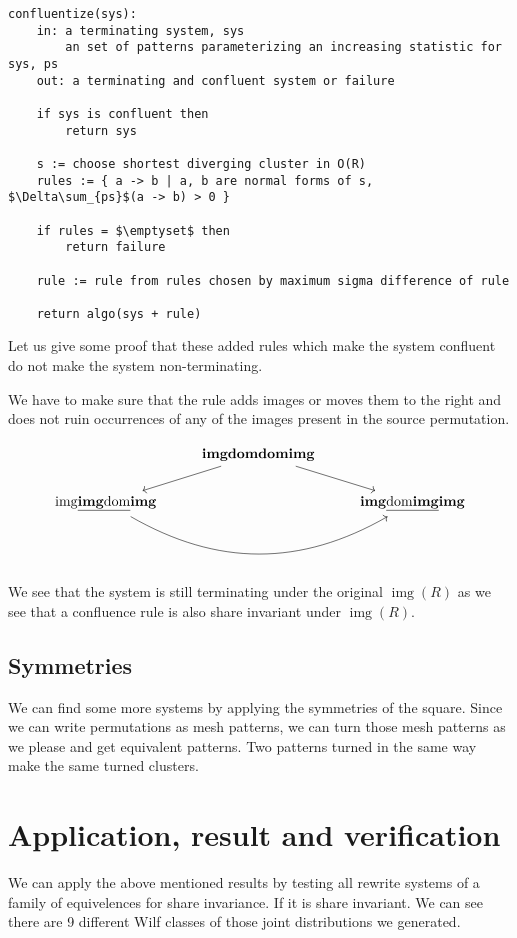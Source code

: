 \documentclass[openany, a4paper, 11pt, english]{article}
\theoremstyle{definition}
\DeclareMathOperator{\img}{img}
\begin{document}
\lstset{basicstyle=\footnotesize\ttfamily, frame=single, breaklines=true,
mathescape=true}
\begin{minipage}{\linewidth}
\begin{lstlisting}[title={Confluentize}]
confluentize(sys):
    in: a terminating system, sys
        an set of patterns parameterizing an increasing statistic for sys, ps
    out: a terminating and confluent system or failure

    if sys is confluent then
        return sys

    s := choose shortest diverging cluster in O(R)
    rules := { a -> b | a, b are normal forms of s, $\Delta\sum_{ps}$(a -> b) > 0 }

    if rules = $\emptyset$ then
        return failure

    rule := rule from rules chosen by maximum sigma difference of rule

    return algo(sys + rule)
\end{lstlisting}
\end{minipage}

Let us give some proof that these added rules which make the system confluent do
not make the system non-terminating.
 
We have to make sure that the rule adds images or moves them to the right and does not ruin
occurrences of any of the images present in the source permutation.

\[
\begin{tikzcd}  
    & \mathbf{imgdomdomimg} \arrow[dl] \arrow[dr] & \\
    \mathrm{img}\underline{\mathbf{img}\mathrm{dom}}\mathbf{img} \arrow[bend
    right=30]{rr} & & \mathbf{img}\underline{\mathrm{dom}\mathbf{img}}\mathbf{img}
\end{tikzcd}
\]

We see that the system is still terminating under the original $\img(R)$ as we see
that a confluence rule is also share invariant under $\img(R)$.

\subsection{Symmetries}
We can find some more systems by applying the symmetries of the square. Since we
can write permutations as mesh patterns, we can turn those mesh patterns as we
please and get equivalent patterns. Two patterns turned in the same way make
the same turned clusters. 

\section{Application, result and verification}
We can apply the above mentioned results by testing all rewrite systems of a
family of equivelences for share invariance. If it is share invariant.
We can see there are 9 different Wilf classes of those joint distributions we
generated.
\end{document}
